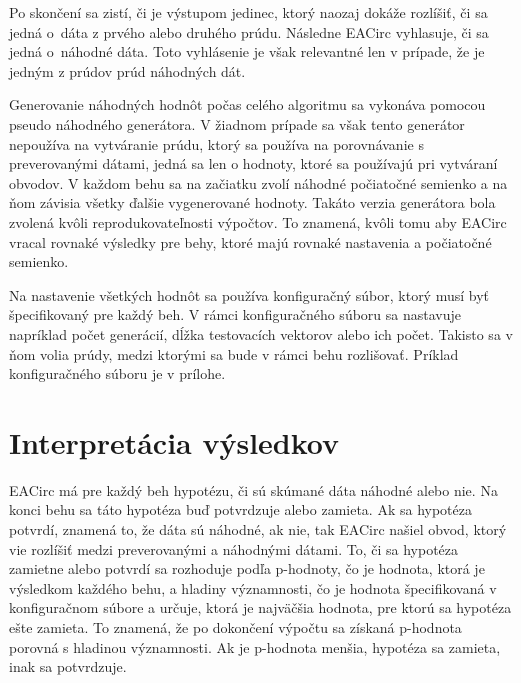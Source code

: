 Po skončení sa zistí, či je výstupom jedinec, ktorý naozaj dokáže rozlíšiť, či sa jedná o~dáta z prvého alebo druhého prúdu. Následne EACirc vyhlasuje, či sa jedná o~náhodné dáta. Toto vyhlásenie je však relevantné len v prípade, že je jedným z prúdov prúd náhodných dát. 

Generovanie náhodných hodnôt počas celého algoritmu sa vykonáva pomocou pseudo náhodného generátora. V žiadnom prípade sa však tento generátor nepoužíva na vytváranie prúdu, ktorý sa používa na porovnávanie s preverovanými dátami, jedná sa len o hodnoty, ktoré sa používajú pri vytváraní obvodov. V každom behu sa na začiatku zvolí náhodné počiatočné semienko a na ňom závisia všetky ďalšie vygenerované hodnoty. Takáto verzia generátora bola zvolená kvôli reprodukovateľnosti výpočtov. To znamená, kvôli tomu aby EACirc vracal rovnaké výsledky pre behy, ktoré majú rovnaké nastavenia a počiatočné semienko.

Na nastavenie všetkých hodnôt sa používa konfiguračný súbor, ktorý musí byť špecifikovaný pre každý beh. V rámci konfiguračného súboru sa nastavuje napríklad počet generácií, dĺžka testovacích vektorov alebo ich počet. Takisto sa v ňom volia prúdy, medzi ktorými sa bude v rámci behu rozlišovať. Príklad konfiguračného súboru je v prílohe.

\section{Interpretácia výsledkov}
\label{sec:result-interpretation}

EACirc má pre každý beh hypotézu, či sú skúmané dáta náhodné alebo nie. Na konci behu sa táto hypotéza buď potvrdzuje alebo zamieta. Ak sa hypotéza potvrdí, znamená to, že dáta sú náhodné, ak nie, tak EACirc našiel obvod, ktorý vie rozlíšiť medzi preverovanými a náhodnými dátami. To, či sa hypotéza zamietne alebo potvrdí sa rozhoduje podľa p-hodnoty, čo je hodnota, ktorá je výsledkom každého behu, a hladiny významnosti, čo je hodnota špecifikovaná v konfiguračnom súbore a určuje, ktorá je najväčšia hodnota, pre ktorú sa hypotéza ešte zamieta. To znamená, že po dokončení výpočtu sa získaná p-hodnota porovná s hladinou významnosti. Ak je p-hodnota menšia, hypotéza sa zamieta, inak sa potvrdzuje. 

